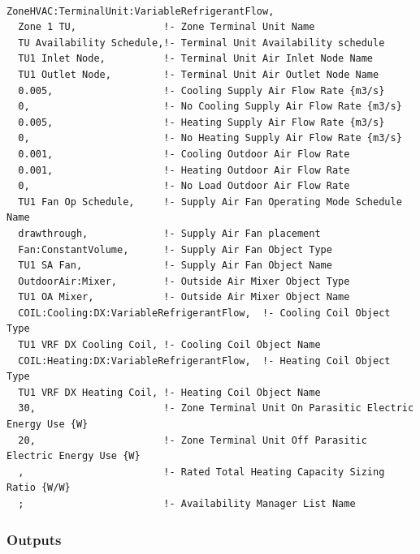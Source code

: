 \begin{lstlisting}

ZoneHVAC:TerminalUnit:VariableRefrigerantFlow,
  Zone 1 TU,               !- Zone Terminal Unit Name
  TU Availability Schedule,!- Terminal Unit Availability schedule
  TU1 Inlet Node,          !- Terminal Unit Air Inlet Node Name
  TU1 Outlet Node,         !- Terminal Unit Air Outlet Node Name
  0.005,                   !- Cooling Supply Air Flow Rate {m3/s}
  0,                       !- No Cooling Supply Air Flow Rate {m3/s}
  0.005,                   !- Heating Supply Air Flow Rate {m3/s}
  0,                       !- No Heating Supply Air Flow Rate {m3/s}
  0.001,                   !- Cooling Outdoor Air Flow Rate
  0.001,                   !- Heating Outdoor Air Flow Rate
  0,                       !- No Load Outdoor Air Flow Rate
  TU1 Fan Op Schedule,     !- Supply Air Fan Operating Mode Schedule Name
  drawthrough,             !- Supply Air Fan placement
  Fan:ConstantVolume,      !- Supply Air Fan Object Type
  TU1 SA Fan,              !- Supply Air Fan Object Name
  OutdoorAir:Mixer,        !- Outside Air Mixer Object Type
  TU1 OA Mixer,            !- Outside Air Mixer Object Name
  COIL:Cooling:DX:VariableRefrigerantFlow,  !- Cooling Coil Object Type
  TU1 VRF DX Cooling Coil, !- Cooling Coil Object Name
  COIL:Heating:DX:VariableRefrigerantFlow,  !- Heating Coil Object Type
  TU1 VRF DX Heating Coil, !- Heating Coil Object Name
  30,                      !- Zone Terminal Unit On Parasitic Electric Energy Use {W}
  20,                      !- Zone Terminal Unit Off Parasitic Electric Energy Use {W}
  ,                        !- Rated Total Heating Capacity Sizing Ratio {W/W}
  ;                        !- Availability Manager List Name
\end{lstlisting}

\subsubsection{Outputs}\label{outputs-12-006}

